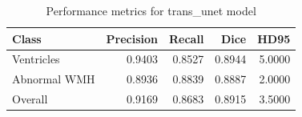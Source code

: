 \begin{table}
\caption{Performance metrics for trans_unet model}
\label{tab:trans_unet_metrics}
\begin{tabular}{lrrrr}
\toprule
Class & Precision & Recall & Dice & HD95 \\
\midrule
Ventricles & 0.9403 & 0.8527 & 0.8944 & 5.0000 \\
Abnormal WMH & 0.8936 & 0.8839 & 0.8887 & 2.0000 \\
Overall & 0.9169 & 0.8683 & 0.8915 & 3.5000 \\
\bottomrule
\end{tabular}
\end{table}
